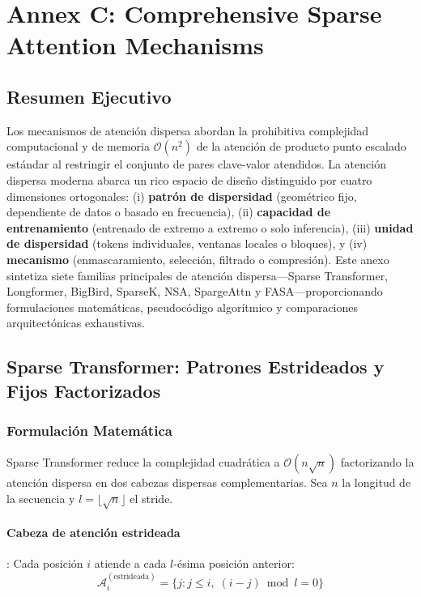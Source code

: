 \section{Annex C: Comprehensive Sparse Attention Mechanisms}
\label{sec:annex-sparse}

\subsection{Resumen Ejecutivo}

Los mecanismos de atención dispersa abordan la prohibitiva complejidad computacional y de memoria $\mathcal{O}(n^2)$ de la atención de producto punto escalado estándar al restringir el conjunto de pares clave-valor atendidos. La atención dispersa moderna abarca un rico espacio de diseño distinguido por cuatro dimensiones ortogonales: (i) \textbf{patrón de dispersidad} (geométrico fijo, dependiente de datos o basado en frecuencia), (ii) \textbf{capacidad de entrenamiento} (entrenado de extremo a extremo o solo inferencia), (iii) \textbf{unidad de dispersidad} (tokens individuales, ventanas locales o bloques), y (iv) \textbf{mecanismo} (enmascaramiento, selección, filtrado o compresión). Este anexo sintetiza siete familias principales de atención dispersa---Sparse Transformer, Longformer, BigBird, SparseK, NSA, SpargeAttn y FASA---proporcionando formulaciones matemáticas, pseudocódigo algorítmico y comparaciones arquitectónicas exhaustivas.

\subsection{Sparse Transformer: Patrones Estrideados y Fijos Factorizados}

\subsubsection{Formulación Matemática}

Sparse Transformer \citep{child_sparse_transformer_2019} reduce la complejidad cuadrática a $\mathcal{O}(n\sqrt{n})$ factorizando la atención dispersa en dos cabezas dispersas complementarias. Sea $n$ la longitud de la secuencia y $l = \lfloor\sqrt{n}\rfloor$ el stride.

\paragraph{Cabeza de atención estrideada}: Cada posición $i$ atiende a cada $l$-ésima posición anterior:
\[
\mathcal{A}_i^{(\text{estrideada})} = \{j : j \leq i,\; (i - j) \bmod l = 0\}
\]

